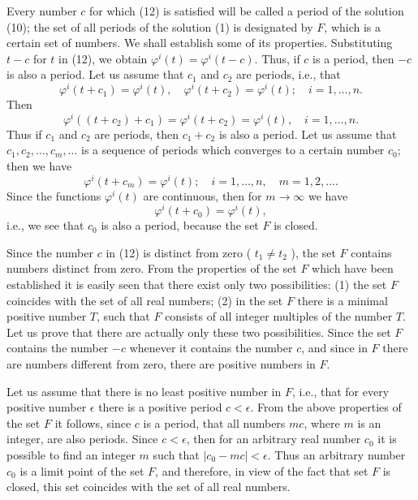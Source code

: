\documentclass[10pt,a5paper]{book}
\theoremstyle{plain}
\theoremstyle{definition}
\theoremstyle{remark}
\begin{document}
Every number $c$ for which (12) is satisfied will be called a period of the solution (10); the set of all periods of the solution (1) is designated by $F$, which is a certain set of numbers. We shall establish some of its properties. Substituting $t-c$ for $t$ in (12), we obtain $\varphi^{i}(t)=\varphi^{i}(t-c)$. Thus, if $c$ is a period, then $-c$ is also a period. Let us assume that $c_{1}$ and $c_{2}$ are periods, i.e., that
\[
\varphi^{i}\left(t+c_{1}\right)=\varphi^{i}(t), \quad \varphi^{i}\left(t+c_{2}\right)=\varphi^{i}(t) ; \quad i=1, \ldots, n .
\]
Then
\[
\varphi^{i}\left(\left(t+c_{2}\right)+c_{1}\right)=\varphi^{i}\left(t+c_{2}\right)=\varphi^{i}(t), \quad i=1, \ldots, n .
\]
Thus if $c_{1}$ and $c_{2}$ are periods, then $c_{1}+c_{2}$ is also a period. Let us assume that $c_{1}, c_{2}, \ldots, c_{m}, \ldots$ is a sequence of periods which converges to a certain number $c_{0}$; then we have
\[
\varphi^{i}\left(t+c_{m}\right)=\varphi^{i}(t) ; \quad i=1, \ldots, n, \quad m=1,2, \ldots .
\]
Since the functions $\varphi^{i}(t)$ are continuous, then for $m \rightarrow \infty$ we have
\[
\varphi^{i}\left(t+c_{0}\right)=\varphi^{i}(t),
\]
i.e., we see that $c_{0}$ is also a period, because the set $F$ is closed.

Since the number $c$ in (12) is distinct from zero ( $t_{1} \neq t_{2}$ ), the set $F$ contains numbers distinct from zero. From the properties of the set $F$ which have been established it is easily seen that there exist only two possibilities: (1) the set $F$ coincides with the set of all real numbers; (2) in the set $F$ there is a minimal positive number $T$, such that $F$ consists of all integer multiples of the number $T$. Let us prove that there are actually only these two possibilities. Since the set $F$ contains the number $-c$ whenever it contains the number $c$, and since in $F$ there are numbers different from zero, there are positive numbers in $F$.

Let us assume that there is no least positive number in $F$, i.e., that for every positive number $\epsilon$ there is a positive period $c<\epsilon$. From the above properties of the set $F$ it follows, since $c$ is a period, that all numbers $m c$, where $m$ is an integer, are also periods. Since $c<\epsilon$, then for an arbitrary
real number $c_{0}$ it is possible to find an integer $m$ such that $\left|c_{0}-m c\right|<\epsilon$. Thus an arbitrary number $c_{0}$ is a limit point of the set $F$, and therefore, in view of the fact that set $F$ is closed, this set coincides with the set of all real numbers.
\end{document}
